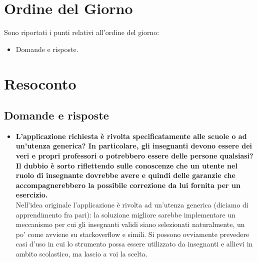\documentclass[11pt,a4paper]{article}
\begin{document}
	\section{Ordine del Giorno}
	Sono riportati i punti relativi all'ordine del giorno:
	\begin{itemize}
		\item Domande e risposte.
	\end{itemize}
	
	\section{Resoconto}
	\subsection{Domande e risposte}
	\begin{itemize}
		\item \textbf{L'applicazione richiesta è rivolta specificatamente alle scuole o ad un'utenza generica? In particolare, gli insegnanti devono essere dei veri e propri professori o potrebbero essere delle persone qualsiasi? Il dubbio è sorto riflettendo sulle conoscenze che un utente nel ruolo di insegnante dovrebbe avere e quindi delle garanzie che accompagnerebbero la possibile correzione da lui fornita per un esercizio.}\\
		Nell'idea originale l'applicazione è rivolta ad un'utenza generica (diciamo di apprendimento fra pari): la soluzione migliore sarebbe implementare un meccanismo per cui gli insegnanti validi siano selezionati naturalmente, un po' come avviene su stackoverflow e simili.
Si possono ovviamente prevedere casi d'uso in cui lo strumento possa essere utilizzato da insegnanti e allievi in ambito scolastico, ma lascio a voi la scelta.


\end{itemize}
\end{document}
